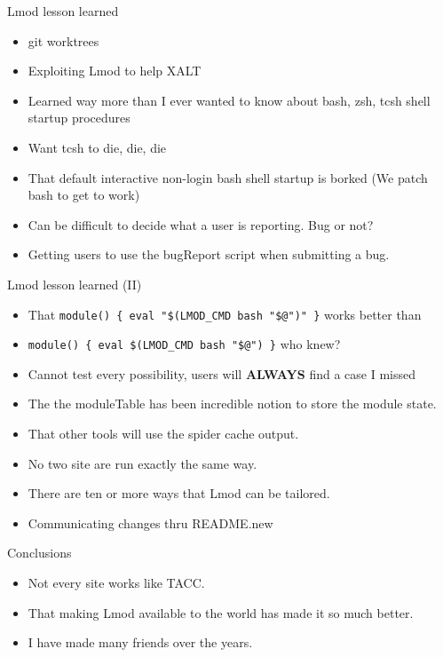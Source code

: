 \documentclass{beamer}
\begin{document}
\begin{frame}{Lmod lesson learned}
  \begin{itemize}
    \item git worktrees
    \item Exploiting Lmod to help XALT
    \item Learned way more than I ever wanted to know about bash, zsh,
      tcsh shell startup procedures
    \item Want tcsh to die, die, die
    \item That default interactive non-login bash shell startup is
      borked (We patch bash to get to work)
    \item Can be difficult to decide what a user is reporting.  Bug or
      not?
    \item Getting users to use the bugReport script when submitting a
      bug.
  \end{itemize}
\end{frame}

\begin{frame}{Lmod lesson learned (II)}
  \begin{itemize}
    \item That \texttt{module() \{ eval "\$(LMOD\_CMD bash "\$@")" \}}
        works better than
      \item \texttt{module() \{ eval \$(LMOD\_CMD bash "\$@") \}} who
        knew?
      \item Cannot test every possibility, users will \textbf{ALWAYS}
        find a case I missed
      \item The the moduleTable has been incredible notion to store
        the module state.
      \item That other tools will use the spider cache output.
      \item No two site are run exactly the same way.
      \item There are ten or more ways that Lmod can be tailored.
      \item Communicating changes thru README.new
  \end{itemize}
\end{frame}


\begin{frame}{Conclusions}
  \begin{itemize}
    \item Not every site works like TACC.
    \item That making Lmod available to the world has made it so much
      better.
    \item I have made many friends over the years.
  \end{itemize}
\end{frame}
\end{document}
